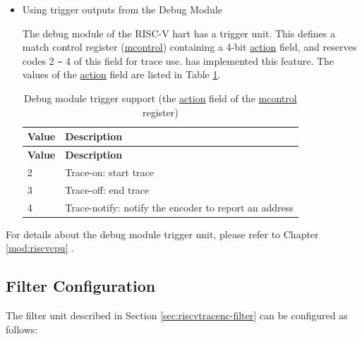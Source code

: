 \documentclass[main\_\_EN.tex]{subfiles}
\begin{document}
\begin{itemize}
        \item Using trigger outputs from the Debug Module

            The debug module of the RISC-V hart has a trigger unit. This defines a match control register (\hyperref[regdesc:MCONTROL]{mcontrol}) containing a 4-bit \hyperref[fielddesc:MCONTROLACTION]{action} field, and reserves codes 2 \verb+~+ 4 of this field for trace use. \chipname{} has implemented this feature. The values of the \hyperref[fielddesc:MCONTROLACTION]{action} field are listed in Table \ref{tab:debug_mcontrol}.

            \begin{longtable}[c]{ |l|l| }
    \caption{Debug module trigger support (the \hyperref[fielddesc:MCONTROLACTION]{action} field of the \hyperref[regdesc:MCONTROL]{mcontrol} register)}
    \label{tab:debug_mcontrol}
    \\\hline\rowcolor{lightgray}
    \textbf{Value} & \textbf{Description} \\\hline
    \endfirsthead
    \textbf{Value} & \textbf{Description} \\\hline
    \endhead
    \endfoot
    \endlastfoot

    2 & Trace-on: start trace \\\hline
    3 & Trace-off: end trace \\\hline
    4 & Trace-notify: notify the encoder to report an address \\\hline

    \end{longtable}
\end{itemize}

For details about the debug module trigger unit, please refer to Chapter \ref{mod:riscvcpu} \textit{}.


\subsection{Filter Configuration}


The filter unit described in Section \ref{sec:riscvtracenc-filter} can be configured as follows:
\end{document}

